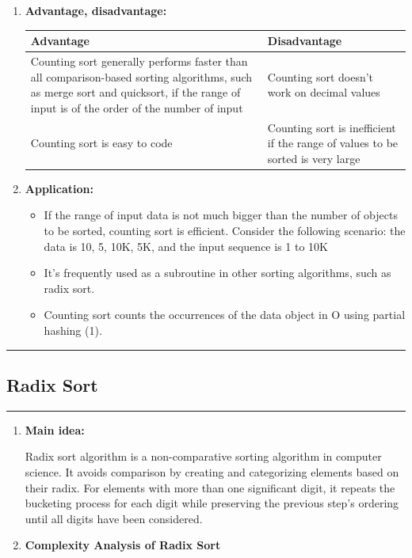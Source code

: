 \documentclass[11pt,a4paper]{article}
\begin{document}
{\begin{enumerate}[label=\textbf{\arabic*})]
				\item \textbf{Advantage, disadvantage:}
					\begin{table}[H]
						\centering
						\begin{tabular}{|p{8cm}|p{8cm}|}
							\hline
							\textbf{Advantage} & \textbf{Disadvantage} \\
							\hline
							\hline
							Counting sort generally performs faster than all comparison-based sorting algorithms, such as merge sort and quicksort, if the range of input is of the order of the number of input  & Counting sort doesn’t work on decimal values \\[12pt]
							Counting sort is easy to code & Counting sort is inefficient if the range of values to be sorted is very large \\
							\hline
						\end{tabular}
					\end{table}
				\item \textbf{Application:}	
					\begin{itemize}
						\item If the range of input data is not much bigger than the number of objects to be sorted, counting sort is efficient. Consider the following scenario: the data is 10, 5, 10K, 5K, and the input sequence is 1 to 10K
						\item It's frequently used as a subroutine in other sorting algorithms, such as radix sort.
						\item Counting sort counts the occurrences of the data object in O using partial hashing (1).
					\end{itemize}
			\end{enumerate}
			
		\rule{15cm}{0.1cm}
		\subsection{Radix Sort}
		\rule{15cm}{0.1cm}
			\begin{enumerate}[label=\textbf{\arabic*})]
				\item \textbf{Main idea:}
				
					Radix sort algorithm is a non-comparative sorting algorithm in computer science. It avoids comparison by creating and categorizing elements based on their radix. For elements with more than one significant digit, it repeats the bucketing process for each digit while preserving the previous step's ordering until all digits have been considered.
				\\[12pt]
				\item \textbf{Complexity Analysis of Radix Sort}
					

\end{enumerate}}
\end{document}
